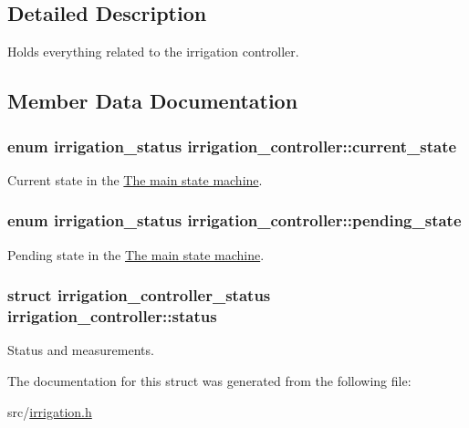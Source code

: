 \subsection{Detailed Description}
Holds everything related to the irrigation controller. 

\subsection{Member Data Documentation}
\hypertarget{structirrigation__controller_a80bec16de2d6f98564ed1487dee041c5}{}
\subsubsection[{current\+\_\+state}]{\setlength{\rightskip}{0pt plus 5cm}enum {\bf irrigation\+\_\+status} irrigation\+\_\+controller\+::current\+\_\+state}\label{structirrigation__controller_a80bec16de2d6f98564ed1487dee041c5}


Current state in the \hyperlink{group__state__machine}{The main state machine}. 

\hypertarget{structirrigation__controller_a7e1c5689983d2b8aae434c2d5442c935}{}
\subsubsection[{pending\+\_\+state}]{\setlength{\rightskip}{0pt plus 5cm}enum {\bf irrigation\+\_\+status} irrigation\+\_\+controller\+::pending\+\_\+state}\label{structirrigation__controller_a7e1c5689983d2b8aae434c2d5442c935}


Pending state in the \hyperlink{group__state__machine}{The main state machine}. 

\hypertarget{structirrigation__controller_a68a854df15c9234d24f2ad36b990bfa8}{}
\subsubsection[{status}]{\setlength{\rightskip}{0pt plus 5cm}struct {\bf irrigation\+\_\+controller\+\_\+status} irrigation\+\_\+controller\+::status}\label{structirrigation__controller_a68a854df15c9234d24f2ad36b990bfa8}


Status and measurements. 



The documentation for this struct was generated from the following file\+:\begin{DoxyCompactItemize}
\item 
src/\hyperlink{irrigation_8h}{irrigation.\+h}\end{DoxyCompactItemize}
